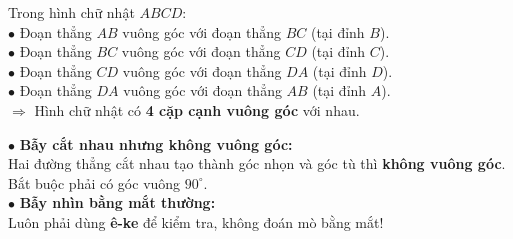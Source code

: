 \documentclass[14pt,a4paper,oneside]{extbook}
\begin{document}
\vspace{2mm}

\noindent
\begin{minipage}[t]{0.53\textwidth}
  \begin{tcolorbox}[
    enhanced,
    title={\footnotesize\bfseries\color{white}\faCheckCircle\ Ví dụ thực hành chuẩn mực},
    colback=green!2!white,
    colframe=green!60!black,
    arc=2.5mm, boxrule=0.8pt, top=1.8mm, bottom=1.8mm, left=2.2mm, right=2.2mm
  ]
    \footnotesize
    Trong hình chữ nhật $ABCD$:\\
    $\bullet$ Đoạn thẳng $AB$ vuông góc với đoạn thẳng $BC$ (tại đỉnh $B$).\\
    $\bullet$ Đoạn thẳng $BC$ vuông góc với đoạn thẳng $CD$ (tại đỉnh $C$).\\
    $\bullet$ Đoạn thẳng $CD$ vuông góc với đoạn thẳng $DA$ (tại đỉnh $D$).\\
    $\bullet$ Đoạn thẳng $DA$ vuông góc với đoạn thẳng $AB$ (tại đỉnh $A$).\\
    $\Rightarrow$ Hình chữ nhật có \textbf{4 cặp cạnh vuông góc} với nhau.
  \end{tcolorbox}
\end{minipage}%
\hfill
\begin{minipage}[t]{0.45\textwidth}
  \begin{tcolorbox}[
    enhanced,
    title={\footnotesize\bfseries\color{white}\faExclamationTriangle\ Mẹo tránh bẫy trắc nghiệm},
    colback=red!2!white,
    colframe=red!70!black,
    arc=2.5mm, boxrule=0.8pt, top=1.8mm, bottom=1.8mm, left=2.2mm, right=2.2mm
  ]
    \footnotesize
    $\bullet$ \textbf{Bẫy cắt nhau nhưng không vuông góc:}\\
    Hai đường thẳng cắt nhau tạo thành góc nhọn và góc tù thì \textbf{không vuông góc}. Bắt buộc phải có góc vuông $90^\circ$.\\
    $\bullet$ \textbf{Bẫy nhìn bằng mắt thường:}\\
    Luôn phải dùng \textbf{ê-ke} để kiểm tra, không đoán mò bằng mắt!
  \end{tcolorbox}
\end{minipage}
\end{document}
